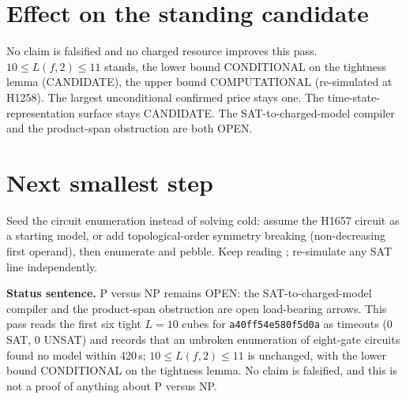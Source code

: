 \documentclass[11pt]{article}
\begin{document}
\section*{Effect on the standing candidate}
No claim is falsified and no charged resource improves this pass. $10\le L(f,2)\le 11$ stands, the lower bound CONDITIONAL on the tightness lemma (CANDIDATE), the upper bound COMPUTATIONAL (re-simulated at H1258). The largest unconditional confirmed price stays one. The time-state-representation surface stays CANDIDATE. The SAT-to-charged-model compiler and the product-span obstruction are both OPEN.

\section*{Next smallest step}
Seed the circuit enumeration instead of solving cold: assume the H1657 circuit as a starting model, or add topological-order symmetry breaking (non-decreasing first operand), then enumerate and pebble. Keep reading ; re-simulate any SAT line independently.

\bigskip
\noindent\textbf{Status sentence.} P versus NP remains OPEN: the SAT-to-charged-model compiler and the product-span obstruction are open load-bearing arrows. This pass reads the first six tight $L=10$ cubes for \texttt{a40ff54e580f5d0a} as timeouts (0 SAT, 0 UNSAT) and records that an unbroken enumeration of eight-gate circuits found no model within 420\,s; $10\le L(f,2)\le 11$ is unchanged, with the lower bound CONDITIONAL on the tightness lemma. No claim is falsified, and this is not a proof of anything about P versus NP.
\end{document}
